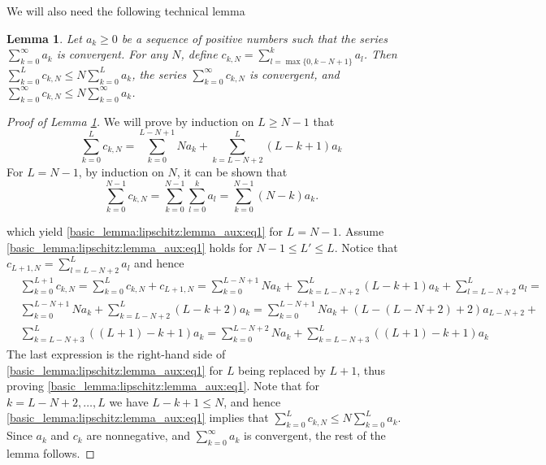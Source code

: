 \documentclass{article}
\newtheorem{lemma}[theorem]{Lemma}
\begin{document}
We will also need the following technical lemma
\begin{lemma}
\label{basic_lemma:lipschitz:lemma_aux}
  Let $a_k \ge 0$ be a sequence of positive numbers such that the series $\sum_{k=0}^{\infty} a_k$ is convergent. For any $N$, define
  $c_{k,N}=\sum_{l=\max\{0,k-N+1\}}^k a_l$. Then  $\sum_{k=0}^{L} c_{k,N} \le N \sum_{k=0}^{L} a_k$, 
  the series $\sum_{k=0}^{\infty} c_{k,N}$ is convergent, and $\sum_{k=0}^{\infty} c_{k,N} \le N \sum_{k=0}^{\infty} a_k$. 
\end{lemma}
\begin{proof}[Proof of Lemma \ref{basic_lemma:lipschitz:lemma_aux}]
     We will prove by induction on $L \ge N-1$ that
     \begin{equation} 
     \label{basic_lemma:lipschitz:lemma_aux:eq1}
       \sum_{k=0}^{L} c_{k,N} = \sum_{k=0}^{L-N+1} N a_k + \sum_{k=L-N+2}^{L} (L-k+1) a_k 
     \end{equation}
     For $L=N-1$, by induction on $N$, it can be shown that 
     \[ \sum_{k=0}^{N-1} c_{k,N}=\sum_{k=0}^{N-1} \sum_{l=0}^{k} a_l = \sum_{k=0}^{N-1} (N-k) a_k.  \]
     
     which yield \eqref{basic_lemma:lipschitz:lemma_aux:eq1} for $L=N-1$. 
     Assume \eqref{basic_lemma:lipschitz:lemma_aux:eq1} holds for $N-1\leq L'\leq L$. Notice that $c_{L+1,N}=\sum_{l=L-N+2}^{L} a_l$ and
     hence
     \[
       \begin{aligned}
         & \sum_{k=0}^{L+1} c_{k,N}=\sum_{k=0}^{L} c_{k,N} + c_{L+1,N}=  \sum_{k=0}^{L-N+1} N a_k + \sum_{k=L-N+2}^{L} (L-k+1) a_k + \sum_{l=L-N+2}^{L} a_l= \\
         & \sum_{k=0}^{L-N+1} N a_k + \sum_{k=L-N+2}^{L} (L-k+2) a_k=\sum_{k=0}^{L-N+1} N a_k + (L-(L-N+2)+2)a_{L-N+2} +  \\
         & \sum_{k=L-N+3}^{L} ((L+1)-k+1) a_k=  
          \sum_{k=0}^{L-N+2} N a_k +\sum_{k=L-N+3}^{L} ((L+1)-k+1) a_k 
       \end{aligned} 
     \]
     The last expression is the right-hand side of 
     \eqref{basic_lemma:lipschitz:lemma_aux:eq1} for $L$ being replaced by $L+1$, thus proving \eqref{basic_lemma:lipschitz:lemma_aux:eq1}.
    Note that for $k=L-N+2,\ldots, L$ we have $L-k+1 \le N$, and hence 
     \eqref{basic_lemma:lipschitz:lemma_aux:eq1} implies that $\sum_{k=0}^{L} c_{k,N} \le N \sum_{k=0}^{L} a_k$. Since 
     $a_k$ and $c_k$ are nonnegative, and $\sum_{k=0}^{\infty} a_k$ is convergent, the rest of the lemma follows.
\end{proof}
\end{document}
